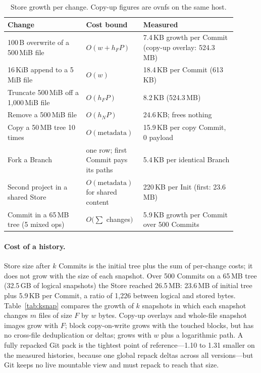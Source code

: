\begin{table}[h]
\centering
\small
\begin{tabular}{p{0.32\linewidth} p{0.20\linewidth} p{0.38\linewidth}}
\toprule
Change & Cost bound & Measured \\
\midrule
100\,B overwrite of a 500\,MiB file & $O(w + h_F P)$ & 7.4\,KB growth per Commit (copy-up overlay: 524.3\,MB) \\
16\,KiB append to a 5\,MiB file & $O(w)$ & 18.4\,KB per Commit (613\,KB) \\
Truncate 500\,MiB off a 1,000\,MiB file & $O(h_F P)$ & 8.2\,KB (524.3\,MB) \\
Remove a 500\,MiB file & $O(h_N P)$ & 24.6\,KB; frees nothing \\
Copy a 50\,MB tree 10 times & $O(\text{metadata})$ & 15.9\,KB per copy Commit, 0 payload \\
Fork a Branch & one row; first Commit pays its paths & 5.4\,KB per identical Branch \\
Second project in a shared Store & $O(\text{metadata})$ for shared content & 220\,KB per Init (first: 23.6\,MB) \\
Commit in a 65\,MB tree (5 mixed ops) & $O(\sum$ changes$)$ & 5.9\,KB growth per Commit over 500 Commits \\
\bottomrule
\end{tabular}
\caption{Store growth per change. Copy-up figures are ovnfs on the same host.}
\label{tab:storagechange}
\end{table}

\paragraph{Cost of a history.} Store size after $k$ Commits is the initial tree plus
the sum of per-change costs; it does not grow with the size of each snapshot. Over 500
Commits on a 65\,MB tree (32.5\,GB of logical snapshots) the Store reached 26.5\,MB:
23.6\,MB of initial tree plus 5.9\,KB per Commit, a ratio of 1,226\X{} between logical
and stored bytes. Table~\ref{tab:ksnap} compares the growth of $k$ snapshots in which
each snapshot changes $m$ files of size $F$ by $w$ bytes. Copy-up overlays and
whole-file snapshot images grow with $F$; block copy-on-write grows with the touched
blocks, but has no cross-file deduplication or deltas; \sys{} grows with $w$ plus a
logarithmic path. A fully repacked Git pack is the tightest point of reference---1.10 to
1.31\X{} smaller on the measured histories, because one global repack deltas across all
versions---but Git keeps no live mountable view and must repack to reach that size.

